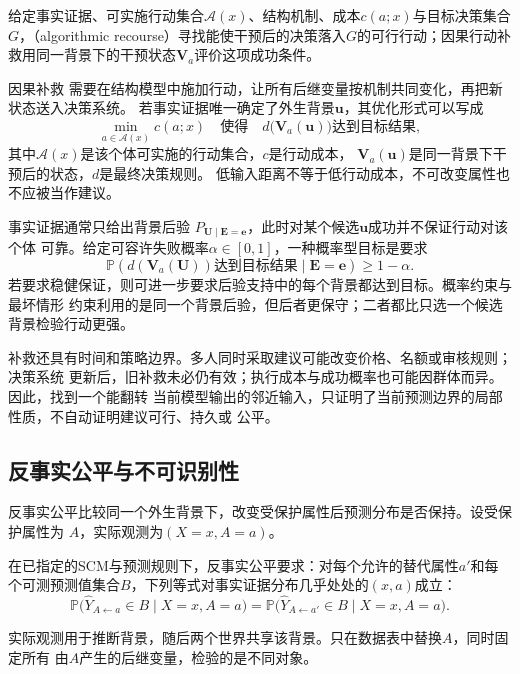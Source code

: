 \begin{definition}[因果行动补救]
  \label{def:causal-recourse}
给定事实证据、可实施行动集合\(\mathcal A(x)\)、结构机制、成本\(c(a;x)\)与目标决策集合\(G\)，（algorithmic recourse）寻找能使干预后的决策落入\(G\)的可行行动；因果行动补救用同一背景下的干预状态\(\bm V_a\)评价这项成功条件。
\end{definition}
因果补救
需要在结构模型中施加行动，让所有后继变量按机制共同变化，再把新状态送入决策系统。
若事实证据唯一确定了外生背景\(\bm u\)，其优化形式可以写成
\begin{equation}
  \min_{a\in\mathcal{A}(x)}
  c(a;x)
  \quad\text{使得}\quad
  d\bigl(\bm{V}_{a}(\bm{u})\bigr)
  \text{达到目标结果},
  \label{eq:causal-recourse-objective}
\end{equation}
其中\(\mathcal{A}(x)\)是该个体可实施的行动集合，\(c\)是行动成本，
\(\bm{V}_a(\bm{u})\)是同一背景下干预后的状态，\(d\)是最终决策规则。
低输入距离不等于低行动成本，不可改变属性也不应被当作建议。

事实证据通常只给出背景后验
\(P_{\bm U\mid\bm E=\bm e}\)，此时对某个候选\(\bm u\)成功并不保证行动对该个体
可靠。给定可容许失败概率\(\alpha\in[0,1]\)，一种概率型目标是要求
\[
  \mathbb{P}\!\left(
    d(\bm V_a(\bm U))\text{达到目标结果}
    \mid \bm E=\bm e
  \right)
  \geq 1-\alpha.
\]
若要求稳健保证，则可进一步要求后验支持中的每个背景都达到目标。概率约束与最坏情形
约束利用的是同一个背景后验，但后者更保守；二者都比只选一个候选背景检验行动更强。

补救还具有时间和策略边界。多人同时采取建议可能改变价格、名额或审核规则；决策系统
更新后，旧补救未必仍有效；执行成本与成功概率也可能因群体而异。因此，找到一个能翻转
当前模型输出的邻近输入，只证明了当前预测边界的局部性质，不自动证明建议可行、持久或
公平。

\subsection{反事实公平与不可识别性}

反事实公平比较同一个外生背景下，改变受保护属性后预测分布是否保持。设受保护属性为
\(A\)，实际观测为\((X=x,A=a)\)。\begin{definition}[反事实公平]
  \label{def:causal-counterfactual-fairness}
在已指定的SCM与预测规则下，反事实公平要求：对每个允许的替代属性\(a'\)和每个可测预测值集合\(B\)，下列等式对事实证据分布几乎处处的\((x,a)\)成立：
\begin{equation}
  \mathbb{P}\bigl(
    \widehat Y_{A\leftarrow a}\in B
    \mid X=x,A=a
  \bigr)
  =
  \mathbb{P}\bigl(
    \widehat Y_{A\leftarrow a'}\in B
    \mid X=x,A=a
  \bigr).
  \label{eq:causal-counterfactual-fairness}
\end{equation}
\end{definition}
实际观测用于推断背景，随后两个世界共享该背景。只在数据表中替换\(A\)，同时固定所有
由\(A\)产生的后继变量，检验的是不同对象。


